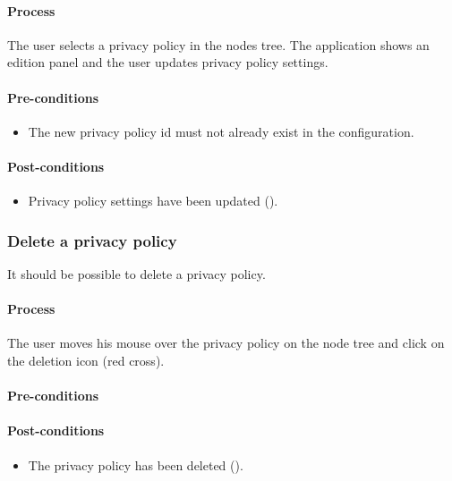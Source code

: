 \documentclass[11pt,a4paper,oneside]{article}
\begin{document}
\paragraph{Process}
The user selects a privacy policy in the nodes tree. The application shows an edition panel and the user updates privacy policy settings.

\paragraph{Pre-conditions}
\begin{itemize}
	\item The new privacy policy id must not already exist in the configuration.
\end{itemize}

\paragraph{Post-conditions}
\begin{itemize}
	\item Privacy policy settings have been updated ().
\end{itemize}

\subsubsection{Delete a privacy policy}
It should be possible to delete a privacy policy.

\paragraph{Process}
The user moves his mouse over the privacy policy on the node tree and click on the deletion icon (red cross).

\paragraph{Pre-conditions}

\paragraph{Post-conditions}
\begin{itemize}
	\item The privacy policy has been deleted ().
\end{itemize}
\end{document}
